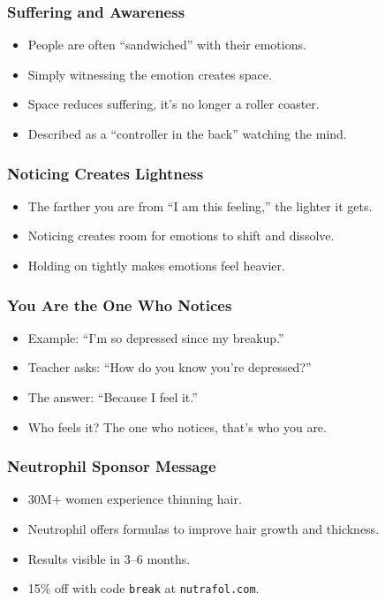 \begin{frame}[fragile]\frametitle{Suffering and Awareness}
  \begin{itemize}
    \item People are often “sandwiched” with their emotions.
    \item Simply witnessing the emotion creates space.
    \item Space reduces suffering, it’s no longer a roller coaster.
    \item Described as a “controller in the back” watching the mind.
  \end{itemize}
\end{frame}

\begin{frame}[fragile]\frametitle{Noticing Creates Lightness}
  \begin{itemize}
    \item The farther you are from “I am this feeling,” the lighter it gets.
    \item Noticing creates room for emotions to shift and dissolve.
    \item Holding on tightly makes emotions feel heavier.
  \end{itemize}
\end{frame}

\begin{frame}[fragile]\frametitle{You Are the One Who Notices}
  \begin{itemize}
    \item Example: “I’m so depressed since my breakup.”
    \item Teacher asks: “How do you know you’re depressed?”
    \item The answer: “Because I feel it.”
    \item Who feels it? The one who notices, that’s who you are.
  \end{itemize}
\end{frame}

\begin{frame}[fragile]\frametitle{Neutrophil Sponsor Message}
  \begin{itemize}
    \item 30M+ women experience thinning hair.
    \item Neutrophil offers formulas to improve hair growth and thickness.
    \item Results visible in 3–6 months.
    \item 15\% off with code \texttt{break} at \texttt{nutrafol.com}.
  \end{itemize}
\end{frame}

